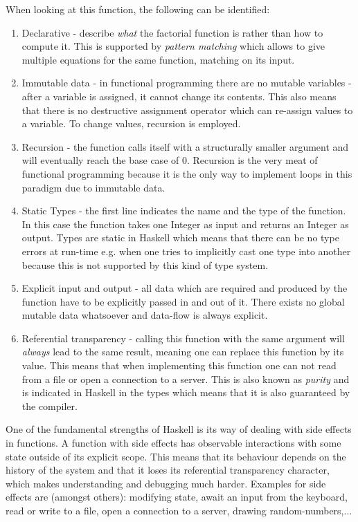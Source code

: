 When looking at this function, the following can be identified: 
\begin{enumerate}
	\item Declarative - describe \textit{what} the factorial function is rather than how to compute it. This is supported by \textit{pattern matching} which allows to give multiple equations for the same function, matching on its input. 
	
	\item Immutable data - in functional programming there are no mutable variables - after a variable is assigned, it cannot change its contents. This also means that there is no destructive assignment operator which can re-assign values to a variable. To change values, recursion is employed.
	
	\item Recursion - the function calls itself with a structurally smaller argument and will eventually reach the base case of 0. Recursion is the very meat of functional programming because it is the only way to implement loops in this paradigm due to immutable data.
	
	\item Static Types - the first line indicates the name and the type of the function. In this case the function takes one Integer as input and returns an Integer as output. Types are static in Haskell which means that there can be no type errors at run-time e.g. when one tries to implicitly cast one type into another because this is not supported by this kind of type system.

	\item Explicit input and output - all data which are required and produced by the function have to be explicitly passed in and out of it. There exists no global mutable data whatsoever and data-flow is always explicit.
	
	\item Referential transparency - calling this function with the same argument will \textit{always} lead to the same result, meaning one can replace this function by its value. This means that when implementing this function one can not read from a file or open a connection to a server. This is also known as \textit{purity} and is indicated in Haskell in the types which means that it is also guaranteed by the compiler.
\end{enumerate}

One of the fundamental strengths of Haskell is its way of dealing with side effects in functions. A function with side effects has observable interactions with some state outside of its explicit scope. This means that its behaviour depends on the history of the system and that it loses its referential transparency character, which makes understanding and debugging much harder. Examples for side effects are (amongst others): modifying state, await an input from the keyboard, read or write to a file, open a connection to a server, drawing random-numbers,...

